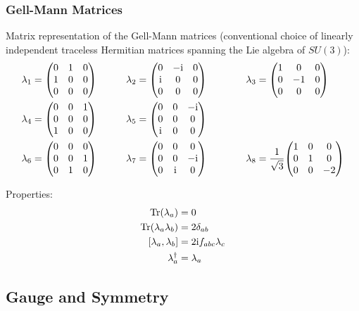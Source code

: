 		\subsubsection{Gell-Mann Matrices}
			Matrix representation of the Gell-Mann matrices (conventional choice of linearly independent traceless Hermitian matrices spanning the Lie algebra of $SU(3)$):
			\begin{alignat}{2}
				\lambda_1 = \mqty(
				0 & 1 & 0 \\
				1 & 0 & 0 \\
				0 & 0 & 0
				) &\hsp
				\lambda_2 = \mqty(
				0 & -\i & 0 \\
				\i & 0 & 0 \\
				0 & 0 & 0
				) &&\hsp
				\lambda_3 = \mqty(
				1 & 0 & 0 \\
				0 & -1 & 0 \\
				0 & 0 & 0
				) \\
				\lambda_4 = \mqty(
				0 & 0 & 1 \\
				0 & 0 & 0 \\
				1 & 0 & 0
				) &\hsp
				\lambda_5 = \mqty(
				0 & 0 & -\i \\
				0 & 0 & 0 \\
				\i & 0 & 0
				) &&\\
				\lambda_6 = \mqty(
				0 & 0 & 0 \\
				0 & 0 & 1 \\
				0 & 1 & 0
				) &\hsp
				\lambda_7 = \mqty(
				0 & 0 & 0 \\
				0 & 0 & -\i \\
				0 & \i & 0
				) &&\hsp
				\lambda_8 = \frac{1}{\sqrt{3}}\mqty(
				1 & 0 & 0 \\
				0 & 1 & 0 \\
				0 & 0 & -2
				)
			\end{alignat}

			\noindent
			Properties:
			\begin{align}
				\tr(\lambda_a) &= 0 \\
				\tr(\lambda_a \lambda_b) &= 2\delta_{ab} \\
				\comm{\lambda_a}{\lambda_b} &= 2\i f_{abc} \lambda_c \\
				\lambda_a^\dagger &= \lambda_a \\
			\end{align}

	\subsection{Gauge and Symmetry}
